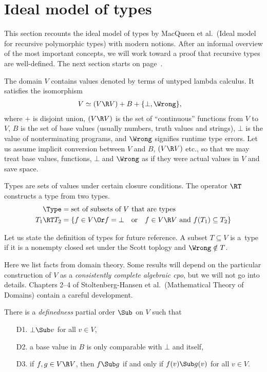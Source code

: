 \documentclass{amsart}
\theoremstyle{definition}
\begin{document}
\section{Ideal model of types}

This section recounts the ideal model of types by MacQueen et
al.\ (Ideal model for recursive polymorphic types) with modern
notions. After an informal overview of the most important
concepts, we will work toward a proof that recursive types are
well-defined. The next section starts on
page~\pageref{after-domain-theory}.


The domain $V$ contains values denoted by terms of untyped lambda
calculus. It satisfies the isomorphism
\begin{align}
\label{domain-eq}
V&\simeq (V\R V)+B+\{\bot,\Wrong\},
\end{align}
where $+$ is disjoint union, $(V\R V)$ is the set of
``continuous'' functions from $V$ to $V$, $B$ is the set of base
values (usually numbers, truth values and strings), $\bot$ is the
value of nonterminating programs, and $\Wrong$ signifies runtime
type errors. Let us assume implicit conversion between $V$ and
$B$, $(V\R V)$ etc., so that we may treat base values, functions,
$\bot$ and $\Wrong$ as if they were actual values in $V$ and save
space.

Types are sets of values under certain closure conditions. The
operator $\RT$ constructs a type from two types.
\begin{align*}
\Type &= \text{set of subsets of $V$ that are types}\\
T_1\RT T_2 &= \{f\in V
\Or
f=\bot\quad\text{or}\quad
f\in V\R V\text{ and }f(T_1)\subseteq T_2
\}
\end{align*}

Let us state the definition of types for future reference. A
subset $T\subseteq V$ is a~type if it is a nonempty closed set
under the Scott toplogy and $\Wrong\notin T$.

\label{domain-theory}

Here we list facts from domain theory. Some results will depend
on the particular construction of $V$ as a \emph{consistently
complete algebraic cpo}, but we will not go into details.
Chapters 2--4 of Stoltenberg-Hansen et al.\ (Mathematical Theory
of Domains) contain a careful development.

There is a \emph{definedness} partial order $\Sub$ on $V$ such
that
\begin{itemize}
\item [D1.] $\bot\Sub v$ for all $v\in V$,
\item [D2.] a base value in $B$ is only comparable with $\bot$ and
itself,
\item [D3.] if $f,g\in V\R V$, then $f\Sub g$ if and only if $f(v)\Sub
g(v)$ for all $v\in V$.
\end{itemize}
\end{document}
